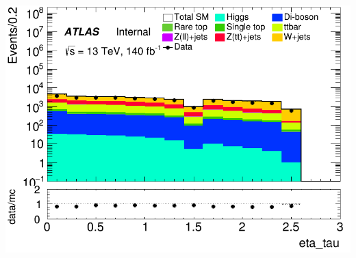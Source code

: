\documentclass[usenames,dvipsnames]{beamer}
\begin{document}
\begin{frame}
    \hfill
    \begin{minipage}{0.32\textwidth}
        \centering
        \includegraphics[width=\textwidth]{graphics/LH_met/LH_met_eta_tau.png}
    \end{minipage}
\end{frame}
\end{document}
